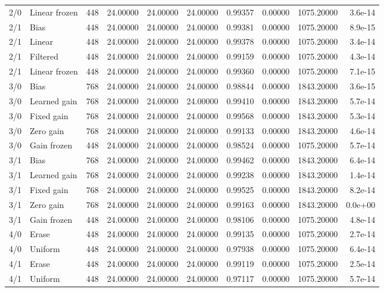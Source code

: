 \begin{longtable}{rllrrrrrrr}
2/0 & Linear frozen & 448 & 24.00000 & 24.00000 & 24.00000 & 0.99357 & 0.00000 & 1075.20000 & 3.6e-14 \\
2/1 & Bias & 448 & 24.00000 & 24.00000 & 24.00000 & 0.99381 & 0.00000 & 1075.20000 & 8.9e-15 \\
2/1 & Linear & 448 & 24.00000 & 24.00000 & 24.00000 & 0.99378 & 0.00000 & 1075.20000 & 3.4e-14 \\
2/1 & Filtered & 448 & 24.00000 & 24.00000 & 24.00000 & 0.99159 & 0.00000 & 1075.20000 & 4.3e-14 \\
2/1 & Linear frozen & 448 & 24.00000 & 24.00000 & 24.00000 & 0.99360 & 0.00000 & 1075.20000 & 7.1e-15 \\
3/0 & Bias & 768 & 24.00000 & 24.00000 & 24.00000 & 0.98844 & 0.00000 & 1843.20000 & 3.6e-15 \\
3/0 & Learned gain & 768 & 24.00000 & 24.00000 & 24.00000 & 0.99410 & 0.00000 & 1843.20000 & 5.7e-14 \\
3/0 & Fixed gain & 768 & 24.00000 & 24.00000 & 24.00000 & 0.99568 & 0.00000 & 1843.20000 & 5.3e-14 \\
3/0 & Zero gain & 768 & 24.00000 & 24.00000 & 24.00000 & 0.99133 & 0.00000 & 1843.20000 & 4.6e-14 \\
3/0 & Gain frozen & 448 & 24.00000 & 24.00000 & 24.00000 & 0.98524 & 0.00000 & 1075.20000 & 5.7e-14 \\
3/1 & Bias & 768 & 24.00000 & 24.00000 & 24.00000 & 0.99462 & 0.00000 & 1843.20000 & 6.4e-14 \\
3/1 & Learned gain & 768 & 24.00000 & 24.00000 & 24.00000 & 0.99238 & 0.00000 & 1843.20000 & 1.4e-14 \\
3/1 & Fixed gain & 768 & 24.00000 & 24.00000 & 24.00000 & 0.99525 & 0.00000 & 1843.20000 & 8.2e-14 \\
3/1 & Zero gain & 768 & 24.00000 & 24.00000 & 24.00000 & 0.99163 & 0.00000 & 1843.20000 & 0.0e+00 \\
3/1 & Gain frozen & 448 & 24.00000 & 24.00000 & 24.00000 & 0.98106 & 0.00000 & 1075.20000 & 4.8e-14 \\
4/0 & Erase & 448 & 24.00000 & 24.00000 & 24.00000 & 0.99135 & 0.00000 & 1075.20000 & 2.7e-14 \\
4/0 & Uniform & 448 & 24.00000 & 24.00000 & 24.00000 & 0.97938 & 0.00000 & 1075.20000 & 6.4e-14 \\
4/1 & Erase & 448 & 24.00000 & 24.00000 & 24.00000 & 0.99119 & 0.00000 & 1075.20000 & 2.5e-14 \\
4/1 & Uniform & 448 & 24.00000 & 24.00000 & 24.00000 & 0.97117 & 0.00000 & 1075.20000 & 5.7e-14 \\
\bottomrule
\end{longtable}

